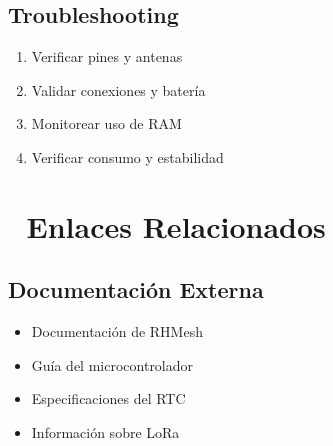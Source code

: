 \documentclass[a4paper,11pt,spanish]{sphinxmanual}
\begin{document}
\section{Troubleshooting}
\label{\detokenize{index:troubleshooting}}\begin{enumerate}
%
\item {} 
\sphinxAtStartPar
{} Verificar pines y antenas

\item {} 
\sphinxAtStartPar
{} Validar conexiones y batería

\item {} 
\sphinxAtStartPar
{} Monitorear uso de RAM

\item {} 
\sphinxAtStartPar
{} Verificar consumo y estabilidad

\end{enumerate}


\chapter{🔗 Enlaces Relacionados}
\label{\detokenize{index:enlaces-relacionados}}

\section{Documentación Externa}
\label{\detokenize{index:documentacion-externa}}\begin{itemize}
\item {} 
\sphinxAtStartPar
{} Documentación de RHMesh

\item {} 
\sphinxAtStartPar
{} Guía del microcontrolador

\item {} 
\sphinxAtStartPar
{} Especificaciones del RTC

\item {} 
\sphinxAtStartPar
{} Información sobre LoRa

\end{itemize}
\end{document}
